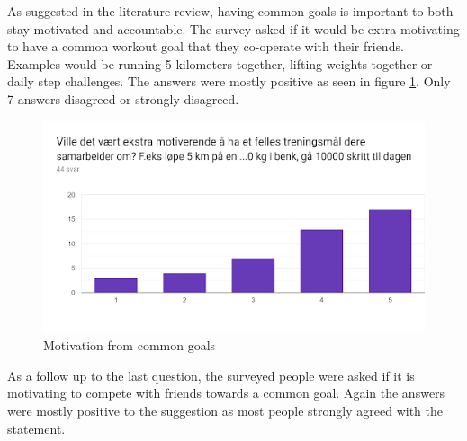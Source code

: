 As suggested in the literature review, having common goals is important to both stay motivated and accountable. The survey asked if it would be extra motivating to have a common workout goal that they co-operate with their friends. Examples would be running 5 kilometers together, lifting weights together or daily step challenges. The answers were mostly positive as seen in figure \ref{cgs}. Only 7 answers disagreed or strongly disagreed.
\begin{figure}[H]
    \centering
    \includegraphics[width=120mm]{figures/FellesMaal.png}
    \caption{Motivation from common goals}
    \label{cgs}
\end{figure}
As a follow up to the last question, the surveyed people were asked if it is motivating to compete with friends towards a common goal. Again the answers were mostly positive to the suggestion as most people strongly agreed with the statement. 


